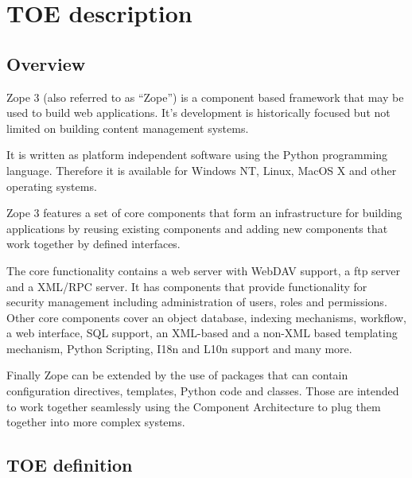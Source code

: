 \documentclass[10pt,a4paper,english]{scrbook}
\begin{document}
\hypertarget{toe-description}{}
\chapter{TOE description}



\hypertarget{overview}{}
\section{Overview}

Zope 3 (also referred to as ``Zope'') is a component based framework that may be
used to build web applications. It's development is historically focused but
not limited on building content management systems.

It is written as platform independent software using the Python programming
language. Therefore it is available for Windows NT, Linux, MacOS X and other
operating systems.

Zope 3 features a set of core components that form an infrastructure for 
building applications by reusing existing components and adding new components
that work together by defined interfaces.

The core functionality contains a web server with WebDAV support, a ftp server
and a XML/RPC server.  It has components that provide functionality for
security management including administration of users, roles and permissions.
Other core components cover an object database, indexing mechanisms,
workflow, a web interface, SQL support, an XML-based and a non-XML based templating
mechanism, Python Scripting, I18n and L10n support and many more.

Finally Zope can be extended by the use of packages that can contain
configuration directives, templates, Python code and classes. Those are
intended to work together seamlessly using the Component Architecture to plug
them together into more complex systems.



\hypertarget{toe-definition}{}
\section{TOE definition}
\end{document}
